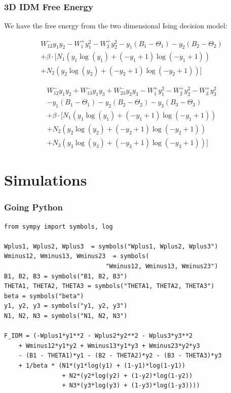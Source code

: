 \documentclass[xcolor={fixpdftex,hyperref,x11names},10pt,pdftex,hyperref={pdftex}]{beamer}
\begin{document}
\begin{frame}
  \frametitle{3D IDM Free Energy}
  We have the free energy from the two dimensional Ising decision model:

\begin{equation*}
    \begin{split}
    W^-_{12} y_{1} y_{2} - W^+_{1} y_{1}^{2} - W^+_{2} y_{2}^{2} - y_{1}
    (B_{1} - \Theta_{1}) - y_{2} (B_{2} - \Theta_{2})\\
    + \beta \cdot [N_{1} (y_{1} \operatorname{log}(y_{1}) + (- y_{1} + 1)
    \operatorname{log}(- y_{1} + 1))\\
    + N_{2} (y_{2} \operatorname{log}(y_{2}) + (- y_{2} + 1)
    \operatorname{log}(- y_{2} + 1))]
    \end{split}
\end{equation*}

\begin{equation*}
    \begin{split}
    W^-_{12} y_{1} y_{2} + W^-_{13} y_{1} y_{3} + W^-_{23} y_{2} y_{3} -
    W^+_{1} y_{1}^{2} - W^+_{2} y_{2}^{2} - W^+_{3} y_{3}^{2} \\
    - y_{1} (B_{1} - \Theta_{1}) - y_{2} (B_{2} -
    \Theta_{2}) - y_{3} (B_{3} - \Theta_{3}) \\
    + \beta \cdot [N_{1} (y_{1} \operatorname{log}(y_{1}) + (- y_{1} + 1)
    \operatorname{log}(- y_{1} + 1))\\
    + N_{2} (y_{2} \operatorname{log}(y_{2}) + (- y_{2} + 1)
    \operatorname{log}(- y_{2} + 1))\\
    + N_{3} (y_{3} \operatorname{log}(y_{3}) + (- y_{3} +
    1) \operatorname{log}(- y_{3} + 1))]
    \end{split}
\end{equation*}
\end{frame}

\section{Simulations}
\label{sec:simu}

\begin{frame}[fragile]
  \frametitle{Going Python}
  \begin{verbatim}
from sympy import symbols, log

Wplus1, Wplus2, Wplus3  = symbols("Wplus1, Wplus2, Wplus3")
Wminus12, Wminus13, Wminus23  = symbols(
                            "Wminus12, Wminus13, Wminus23")
B1, B2, B3 = symbols("B1, B2, B3")
THETA1, THETA2, THETA3 = symbols("THETA1, THETA2, THETA3")
beta = symbols("beta")
y1, y2, y3 = symbols("y1, y2, y3")
N1, N2, N3 = symbols("N1, N2, N3")

F_IDM = (-Wplus1*y1**2 - Wplus2*y2**2 - Wplus3*y3**2
    + Wminus12*y1*y2 + Wminus13*y1*y3 + Wminus23*y2*y3
    - (B1 - THETA1)*y1 - (B2 - THETA2)*y2 - (B3 - THETA3)*y3
    + 1/beta * (N1*(y1*log(y1) + (1-y1)*log(1-y1))
                + N2*(y2*log(y2) + (1-y2)*log(1-y2))
                + N3*(y3*log(y3) + (1-y3)*log(1-y3))))
  \end{verbatim}
\end{frame}
\end{document}
